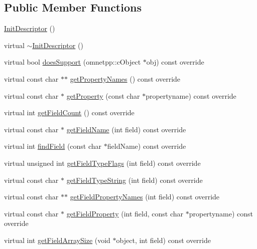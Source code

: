 \subsection*{Public Member Functions}
\begin{DoxyCompactItemize}
\item 
\hyperlink{class_init_descriptor_ab339ad8c646e3ebd54fca1d423669bcc}{Init\+Descriptor} ()
\item 
virtual \hyperlink{class_init_descriptor_a557046f2e1493c983f0dc57d67c48291}{$\sim$\+Init\+Descriptor} ()
\item 
virtual bool \hyperlink{class_init_descriptor_aa4691376d7b2f08fa800fff585125ea3}{does\+Support} (omnetpp\+::c\+Object $\ast$obj) const override
\item 
virtual const char $\ast$$\ast$ \hyperlink{class_init_descriptor_a50255fad26833319e82ea83650fa6eb9}{get\+Property\+Names} () const override
\item 
virtual const char $\ast$ \hyperlink{class_init_descriptor_a272a35c10d988eb431d03dd2d327512c}{get\+Property} (const char $\ast$propertyname) const override
\item 
virtual int \hyperlink{class_init_descriptor_ac70ed57d62820b4dd4bd68b55d4c8b10}{get\+Field\+Count} () const override
\item 
virtual const char $\ast$ \hyperlink{class_init_descriptor_a0c6fa440b30d1abd3d6e76f9845c6699}{get\+Field\+Name} (int field) const override
\item 
virtual int \hyperlink{class_init_descriptor_aa2e3648dd471c37754733337cbdccea0}{find\+Field} (const char $\ast$field\+Name) const override
\item 
virtual unsigned int \hyperlink{class_init_descriptor_ac608a1e528e9e41968ac118ff3c138e5}{get\+Field\+Type\+Flags} (int field) const override
\item 
virtual const char $\ast$ \hyperlink{class_init_descriptor_a5896b2cc03302e1b6f67168f0e9612e6}{get\+Field\+Type\+String} (int field) const override
\item 
virtual const char $\ast$$\ast$ \hyperlink{class_init_descriptor_a540feb97164ff9118592619a94887e35}{get\+Field\+Property\+Names} (int field) const override
\item 
virtual const char $\ast$ \hyperlink{class_init_descriptor_a9ec2bc98d856cb3166f66eab70eb6279}{get\+Field\+Property} (int field, const char $\ast$propertyname) const override
\item 
virtual int \hyperlink{class_init_descriptor_a7d04a2b854a3408ae32479cfb5eeb253}{get\+Field\+Array\+Size} (void $\ast$object, int field) const override

\end{DoxyCompactItemize}
